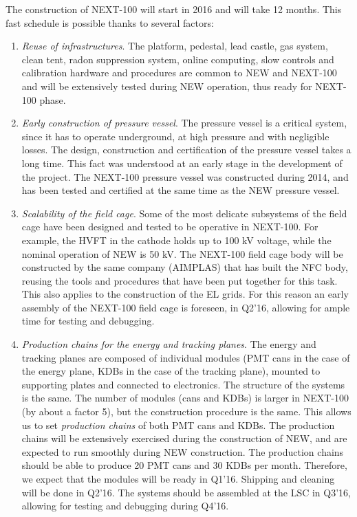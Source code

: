 The construction of NEXT-100 will start in 2016 and will take 12 months. This fast schedule is possible thanks to several factors:
%
\begin{enumerate}
\item {\em Reuse of infrastructures}.
The platform, pedestal, lead castle, gas system, clean tent, radon suppression system, online computing, slow controls and calibration hardware and procedures are common to NEW and NEXT-100 and will be extensively tested during NEW operation, thus ready for NEXT-100 phase.
\item {\em Early construction of pressure vessel}. 
The pressure vessel is a critical system, since it has to operate underground, at high pressure and with negligible losses. The design, construction and certification of the pressure vessel takes a long time. This fact was understood at an early stage in the development of the project. The NEXT-100 pressure vessel was constructed during 2014, and has been tested and certified at the same time as the NEW pressure vessel. 
\item {\em Scalability of the field cage}. 
Some of the most delicate subsystems of the field cage have been designed and tested to be operative in NEXT-100. For example, the HVFT in the cathode holds up to 100 kV voltage, while the nominal operation of NEW is 50 kV. The NEXT-100 field cage body will be constructed by the same company (AIMPLAS) that has built the NFC body, reusing the tools and procedures that have been put together for this task. This also applies to the construction of the EL grids. For this reason an early assembly of the NEXT-100 field cage is foreseen, in Q2'16, allowing for ample time for testing and debugging.

\item {\em Production chains for the energy and tracking planes}. 
The energy and tracking planes are composed of individual modules (PMT cans in the case of the energy plane, KDBs in the case of the tracking plane), mounted to supporting plates and connected to electronics. The structure of the systems is the same. The number of modules (cans and KDBs) is larger in NEXT-100 (by about a factor 5), but the construction procedure is the same. This allows us to set {\em production chains} of both PMT cans and KDBs. The production chains will be extensively exercised during the construction of NEW, and are expected to run smoothly during NEW construction. The production chains should be able to produce 20 PMT cans and 30 KDBs per month. Therefore, we expect that the modules will be ready in Q1'16. Shipping and cleaning will be done in Q2'16. The systems should be assembled at the LSC in Q3'16, allowing for testing and debugging during Q4'16.
\end{enumerate}